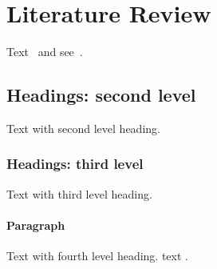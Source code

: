 \section{Literature Review}\label{sec:review}

Text~\cite{levine_ContinuousInverseOptimal_2012a,oh_DiscoveringStateoftheartReinforcement_2025} and see~\cite{terven_LossFunctionsMetrics_2025}.

\subsection{Headings: second level}

Text with second level heading.

\subsubsection{Headings: third level}

Text with third level heading.

\paragraph{Paragraph}

Text with fourth level heading. text \cite{vaswani_AttentionAllYou_2017}.
